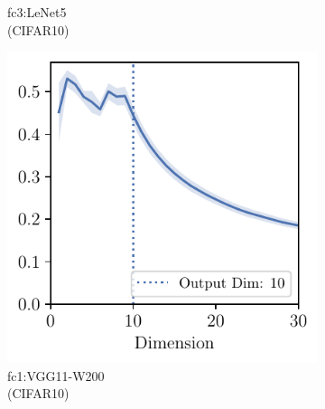 \begin{figure}[H]
\begin{subfigure}[b]{0.24\textwidth}
        \caption{fc3:LeNet5\\(CIFAR10)}
        \label{fig:app_adexp_last_LeNet}
    \end{subfigure}
    \begin{subfigure}[b]{0.24\textwidth}
        \centering
        \captionsetup{justification=centering}
        \includegraphics[width=\textwidth]{Appendix_Figures/Overlap_large_model/overlap_raw/last_layer/CIFAR10_VGG11W200_fxlr0.01_fc1.pdf}
        \caption{fc1:VGG11-W200\\(CIFAR10)}
        \label{fig:app_adexp_last_vgg}
    \end{subfigure}
    \begin{subfigure}[b]{0.24\textwidth}
        \centering
        \captionsetup{justification=centering}

\end{subfigure}
\end{figure}
